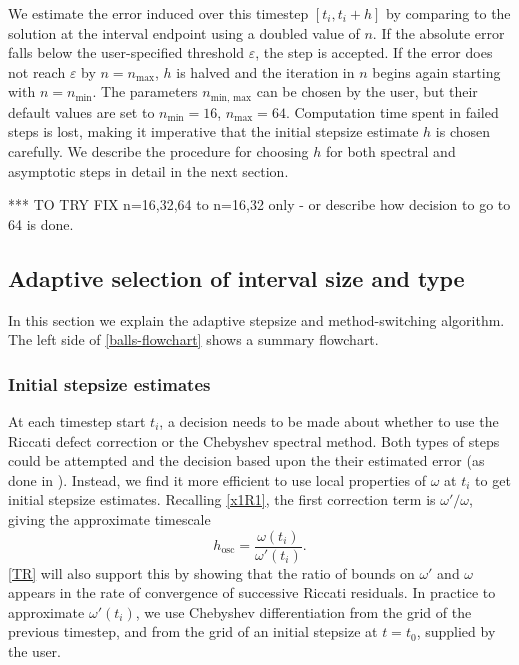 \documentclass[10pt]{article}
\newcommand{\be}{\begin{equation}}
\newcommand{\ee}{\end{equation}}
\newcommand{\om}{\omega}
\begin{document}
We estimate the error induced over this timestep $[t_i,t_i+h]$
by comparing to the solution at the interval endpoint using a doubled value
of $n$.
If the
absolute
error falls below the user-specified
threshold $\varepsilon$, the step is accepted.
If the error does not reach $\varepsilon$ by $n=n_{\text{max}}$, $h$
%
is halved and the iteration in $n$ begins again starting with
$n=n_{\text{min}}$. The parameters $n_{\text{min, max}}$ can be chosen by the
user, but their default values are set to $n_{\text{min}} = 16$,
$n_{\text{max}} = 64$. Computation time spent in failed steps is lost, making
it imperative that the initial stepsize estimate $h$ is chosen carefully. We
describe the procedure for choosing $h$ for both spectral and asymptotic steps
in detail in the next section.

*** TO TRY FIX n=16,32,64 to n=16,32 only - or describe how decision
to go to 64 is done.





\subsection{Adaptive selection of interval size and type}
\label{adap}

In this section we explain the adaptive stepsize and method-switching
algorithm. The left side of \cref{balls-flowchart} shows
a summary flowchart.

\subsubsection{Initial stepsize estimates}
\label{hosc}

At each timestep start $t_i$, a decision needs to be made about whether to
use the Riccati defect correction or the Chebyshev spectral method.
Both types of steps could be attempted
and the decision based upon the their estimated error (as done in \cite{agocs2020efficient}).
Instead, we find it more efficient to use local properties of $\om$ at $t_i$
to get initial stepsize estimates.
Recalling \cref{x1R1}, the first correction term is $\om'/\om$, giving the
approximate timescale
\be\label{hoscini}
h_{\text{osc}} = \frac{\om(t_i)}{\om'(t_i)}.
\ee
\cref{TR} will also support this by showing that
the ratio of bounds on $\om'$ and $\om$ appears in the rate of
convergence of successive Riccati residuals.
In practice to approximate $\om'(t_i)$, we use Chebyshev differentiation
from the grid of the previous timestep, and from the grid of an initial
stepsize at $t=t_0$, supplied by the user.
\end{document}
